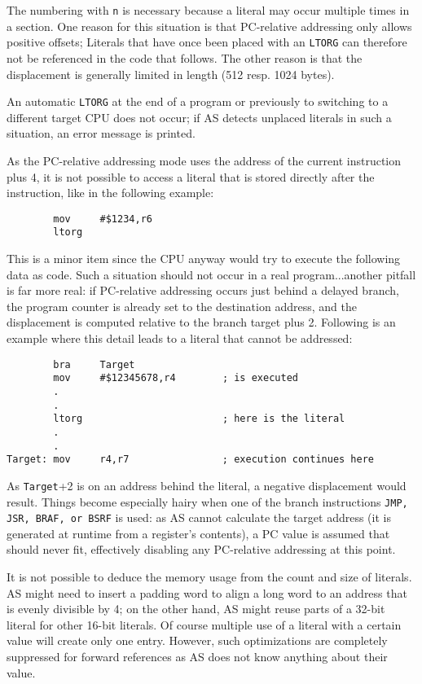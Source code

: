 \documentclass[12pt,twoside]{report}
\newcommand{\tty}[1]{{\tt #1}}
\begin{document}
The numbering with \tty{n} is necessary because a literal may occur
multiple times in a section.  One reason for this situation is that
PC-relative addressing only allows positive offsets; Literals that
have once been placed with an \tty{LTORG} can therefore not be referenced
in the code that follows.  The other reason is that the displacement
is generally limited in length (512 resp. 1024 bytes).

An automatic \tty{LTORG} at the end of a program or previously to
switching to a different target CPU does not occur; if AS detects unplaced
literals in such a situation, an error message is printed.

As the PC-relative addressing mode uses the address of the current
instruction plus 4, it is not possible to access a literal that is
stored directly after the instruction, like in the following example:
\begin{verbatim}
        mov     #$1234,r6
        ltorg
\end{verbatim}
This is a minor item since the CPU anyway would try to execute the
following data as code.  Such a situation should not occur in a real
program...another pitfall is far more real: if PC-relative addressing
occurs just behind a delayed branch, the program counter is already
set to the destination address, and the displacement is computed
relative to the branch target plus 2.  Following is an example where
this detail leads to a literal that cannot be addressed:
\begin{verbatim}
        bra     Target
        mov     #$12345678,r4        ; is executed
        .
        .
        ltorg                        ; here is the literal
        .
        .
Target: mov     r4,r7                ; execution continues here
\end{verbatim}
As \tty{Target}+2 is on an address behind the literal, a negative
displacement would result.  Things become especially hairy when one
of the branch instructions \tty{JMP, JSR, BRAF, or BSRF} is used: as AS
cannot calculate the target address (it is generated at runtime from
a register's contents), a PC value is assumed that should never fit,
effectively disabling any PC-relative addressing at this point.

It is not possible to deduce the memory usage from the count and size
of literals.  AS might need to insert a padding word to align a long
word to an address that is evenly divisible by 4; on the other hand,
AS might reuse parts of a 32-bit literal for other 16-bit literals.
Of course multiple use of a literal with a certain value will create
only one entry.  However, such optimizations are completely
suppressed for forward references as AS does not know anything about
their value.
\end{document}
